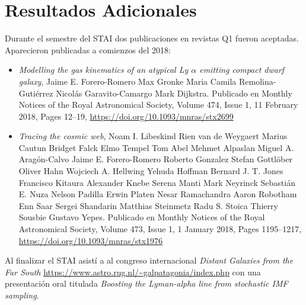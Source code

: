 \documentclass[12pt,spanish]{article}
\begin{document}
\section*{Resultados Adicionales}

Durante el semestre del STAI dos publicaciones en revistas Q1 fueron aceptadas. Aparecieron
  publicadas a comienzos del 2018:

\begin{itemize}
\item{{\it Modelling the gas kinematics of an atypical Ly $\alpha$ emitting
    compact dwarf galaxy}, Jaime E. Forero-Romero  Max Gronke  Maria
  Camila Remolina-Gutiérrez Nicolás Garavito-Camargo  Mark Dijkstra.
  Publicado en Monthly Notices of the Royal Astronomical Society,
  Volume 474, Issue 1, 11 February 2018, Pages 12–19,
  \url{https://doi.org/10.1093/mnras/stx2699}} 
\item{{\it Tracing the cosmic web}, Noam I. Libeskind  Rien van de
  Weygaert  Marius Cautun  Bridget Falck Elmo Tempel  Tom Abel  Mehmet
  Alpaslan  Miguel A. Aragón-Calvo Jaime E. Forero-Romero  Roberto
  Gonzalez  Stefan Gottlöber  Oliver Hahn Wojciech A. Hellwing  Yehuda
  Hoffman  Bernard J. T. Jones  Francisco Kitaura Alexander Knebe
  Serena Manti  Mark Neyrinck  Sebastián E. Nuza Nelson Padilla  Erwin
  Platen  Nesar Ramachandra  Aaron Robotham  Enn Saar Sergei Shandarin
  Matthias Steinmetz  Radu S. Stoica  Thierry Sousbie Gustavo Yepes. 
Publicado en Monthly Notices of the Royal Astronomical Society, Volume
473, Issue 1, 1 January 2018, Pages 1195–1217,
\url{https://doi.org/10.1093/mnras/stx1976}}
\end{itemize}

Al finalizar el STAI asist\'i a al congreso internacional
\emph{Distant Galaxies from the Far South}
\url{https://www.astro.rug.nl/~galpatagonia/index.php} con una
presentaci\'on oral titulada \emph{Boosting the Lyman-alpha
line from stochastic IMF sampling}.
\end{document}
